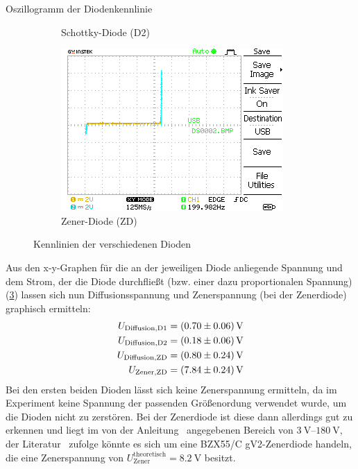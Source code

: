\documentclass{article}
\theoremstyle{definition}
\begin{document}
\begin{aufgabe}{Oszillogramm der Diodenkennlinie}
\begin{figure}[H]
\begin{subfigure}[b]{0.45 \textwidth}
            \caption{Schottky-Diode (D2)}
            \label{a2_1}
        \end{subfigure}
        \hfill
        \begin{subfigure}[b]{0.8 \textwidth}
            \includegraphics[width=\textwidth]{MesswerteVersuch2/m2_2.png}
            \caption{Zener-Diode (ZD)}
            \label{a2_2}
        \end{subfigure}
        \caption{Kennlinien der verschiedenen Dioden}
        \label{a2}
    \end{figure}
    \auswertung
    Aus den x-y-Graphen für die an der jeweiligen Diode anliegende Spannung und dem Strom, der die Diode durchfließt (bzw. einer dazu proportionalen Spannung)(\ref{a2}) lassen sich nun Diffusionsspannung und Zenerspannung (bei der Zenerdiode) graphisch ermitteln:
    \begin{align*}
        U_\mathrm{Diffusion, D1} &= \SI{0.7 +- 0.06}{\volt} \\
        U_\mathrm{Diffusion, D2} &= \SI{0.18 +- 0.06}{\volt} \\
        U_\mathrm{Diffusion, ZD} &= \SI{0.8 +- 0.24}{\volt} \\
        U_\mathrm{Zener, ZD} &= \SI{7.84 +- 0.24}{\volt} \\
    \end{align*}
    Bei den ersten beiden Dioden lässt sich keine Zenerspannung ermitteln, da im Experiment keine Spannung der passenden Größenordung verwendet wurde, um die Dioden nicht zu zerstören. Bei der Zenerdiode ist diese dann allerdings gut zu erkennen und liegt im von der Anleitung~\cite{anleitung} angegebenen Bereich von $\SIrange{3}{180}{\volt}$, der Literatur~\cite{zenerspannungen} zufolge könnte es sich um eine BZX55/C  gV2-Zenerdiode handeln, die eine Zenerspannung von $U_\mathrm{Zener}^\mathrm{theoretisch} = \SI{8.2}{\volt}$ besitzt.


\end{aufgabe}
\end{document}
